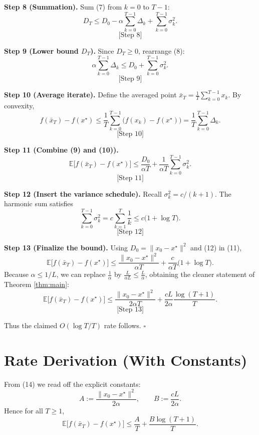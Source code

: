 \documentclass{article}
\newcommand{\E}{\mathbb{E}}
\begin{document}
\noindent\textbf{Step 8 (Summation).}  
Sum (7) from $k=0$ to $T-1$:
\[
D_T\le D_0-\alpha\sum_{k=0}^{T-1}\Delta_k+\sum_{k=0}^{T-1}\sigma_k^2.
\tag{8}
\]
\[
\text{[Step 8]}
\]

\noindent\textbf{Step 9 (Lower bound $D_T$).}  
Since $D_T\ge 0$, rearrange (8):
\[
\alpha\sum_{k=0}^{T-1}\Delta_k\le D_0+\sum_{k=0}^{T-1}\sigma_k^2.
\tag{9}
\]
\[
\text{[Step 9]}
\]

\noindent\textbf{Step 10 (Average iterate).}  
Define the averaged point $\bar{x}_T=\frac1T\sum_{k=0}^{T-1}x_k$.  By convexity,
\[
f(\bar{x}_T)-f(x^\star)\le \frac1T\sum_{k=0}^{T-1}\bigl(f(x_k)-f(x^\star)\bigr)
=\frac1T\sum_{k=0}^{T-1}\Delta_k.
\tag{10}
\]
\[
\text{[Step 10]}
\]

\noindent\textbf{Step 11 (Combine (9) and (10)).}
\[
\E\!\bigl[f(\bar{x}_T)-f(x^\star)\bigr]
\le \frac{D_0}{\alpha T}+\frac{1}{\alpha T}\sum_{k=0}^{T-1}\sigma_k^2.
\tag{11}
\]
\[
\text{[Step 11]}
\]

\noindent\textbf{Step 12 (Insert the variance schedule).}  
Recall $\sigma_k^2=c/(k+1)$.  The harmonic sum satisfies
\[
\sum_{k=0}^{T-1}\sigma_k^2
= c\sum_{k=1}^{T}\frac1k
\le c\bigl(1+\log T\bigr).
\tag{12}
\]
\[
\text{[Step 12]}
\]

\noindent\textbf{Step 13 (Finalize the bound).}  
Using $D_0=\|x_0-x^\star\|^2$ and (12) in (11),
\[
\E\!\bigl[f(\bar{x}_T)-f(x^\star)\bigr]
\le \frac{\|x_0-x^\star\|^2}{\alpha T}
+\frac{c}{\alpha T}\bigl(1+\log T\bigr).
\tag{13}
\]
Because $\alpha\le 1/L$, we can replace $\frac1\alpha$ by $\frac{L}{\alpha L}\le \frac{L}{\alpha}$, obtaining the cleaner statement of Theorem \ref{thm:main}:
\[
\E\!\bigl[f(\bar{x}_T)-f(x^\star)\bigr]
\le \frac{\|x_0-x^\star\|^2}{2\alpha T}
+\frac{cL}{2\alpha}\frac{\log (T+1)}{T}.
\tag{14}
\]
\[
\text{[Step 13]}
\]

Thus the claimed $O(\log T/T)$ rate follows.  $\square$

\section*{Rate Derivation (With Constants)}
From (14) we read off the explicit constants:
\[
A:=\frac{\|x_0-x^\star\|^2}{2\alpha},\qquad
B:=\frac{cL}{2\alpha}.
\]
Hence for all $T\ge 1$,
\[
\E\!\bigl[f(\bar{x}_T)-f(x^\star)\bigr]\le \frac{A}{T}+\frac{B\log (T+1)}{T}.
\]
\end{document}
